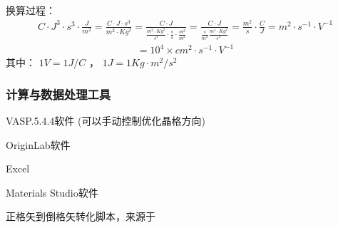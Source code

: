 \documentclass[a4paper,12pt,english]{sphinxmanual}
\begin{document}
\sphinxAtStartPar
换算过程：
\begin{equation*}
\begin{split}C \cdot J^3 \cdot s^3 \cdot \frac{J}{m^2} = \frac{C \cdot J \cdot s^3}{m^2 \cdot Kg^2}
= \frac{C \cdot J}{\frac{m^2 \cdot Kg^2}{s^3} \cdot \frac{s}{s} \cdot \frac{m^2}{m^2}}
= \frac{C \cdot J}{\frac{s}{m^2} \frac{m^4 \cdot Kg^2}{s^4}}
= \frac{m^2}{s} \cdot \frac{C}{J} = m^2 \cdot s^{-1} \cdot V^{-1}\end{split}
\end{equation*}\begin{equation*}
\begin{split}= 10^4 \times cm^2 \cdot s^{-1} \cdot V^{-1}\end{split}
\end{equation*}
\sphinxAtStartPar
其中： \(1 V = 1 J/C\) ， \(1 J = 1Kg \cdot m^2 / s^2\)


\subsubsection{计算与数据处理工具}
\label{\detokenize{tutorials/vasp/mobility:id2}}
\begin{DUlineblock}{0em}
\item[] VASP.5.4.4软件 (可以手动控制优化晶格方向)
\item[] OriginLab软件
\item[] Excel
\item[] Materials Studio软件
\item[] 正格矢到倒格矢转化脚本，来源于 %
\begin{footnote}[28]\sphinxAtStartFootnote
{}
%
\end{footnote}
\end{DUlineblock}
\end{document}
